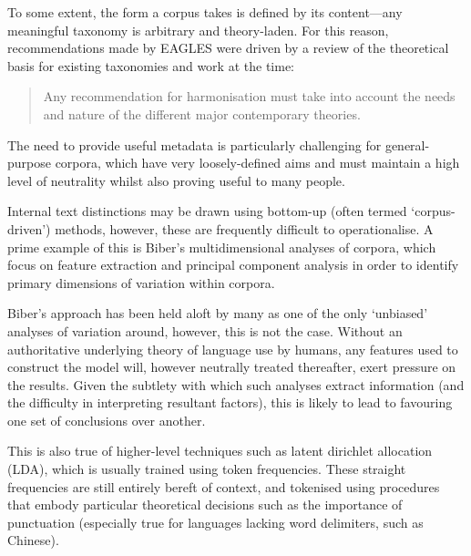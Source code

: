 To some extent, the form a corpus takes is defined by its content---any meaningful taxonomy is arbitrary and theory-laden.  For this reason, recommendations made by EAGLES were driven by a review of the theoretical basis for existing taxonomies and work at the time\cite{EagTcwgCtypeaglespreliminary}:

\begin{quote}
Any recommendation for harmonisation must take into account the needs and nature of the different major contemporary theories.
\end{quote}

The need to provide useful metadata is particularly challenging for general-purpose corpora, which have very loosely-defined aims and must maintain a high level of neutrality whilst also proving useful to many people.




Internal text distinctions may be drawn using bottom-up (often termed `corpus-driven') methods, however, these are frequently difficult to operationalise.  A prime example of this is Biber's multidimensional analyses of corpora\cite{biber1992complexity}, which focus on feature extraction and principal component analysis in order to identify primary dimensions of variation within corpora.

Biber's approach has been held aloft by many as one of the only `unbiased' analyses of variation around, however, this is not the case.  Without an authoritative underlying theory of language use by humans, any features used to construct the model will, however neutrally treated thereafter, exert pressure on the results.  Given the subtlety with which such analyses extract information (and the difficulty in interpreting resultant factors), this is likely to lead to favouring one set of conclusions over another.

This is also true of higher-level techniques such as latent dirichlet allocation (LDA), which is usually trained using token frequencies\cite{Blei2012PTM1338062133826}.  These straight frequencies are still entirely bereft of context, and tokenised using procedures that embody particular theoretical decisions such as the importance of punctuation\cite{pentheroudakis2006tokenizer} (especially true for languages lacking word delimiters, such as Chinese\cite{Wu1994ICT974358974399}).  

